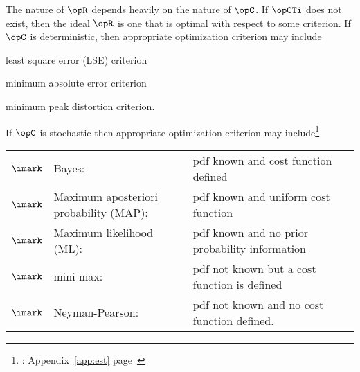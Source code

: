 The nature of $\opR$ depends heavily on the nature of $\opC$.
If $\opCTi$ does not exist,
then the ideal $\opR$ is one that is optimal with respect to some criterion.
If $\opC$ is deterministic,
then appropriate optimization criterion may include
\begin{liste}
   \item least square error (LSE) criterion
   \item minimum absolute error criterion
   \item minimum peak distortion criterion.
\end{liste}
If $\opC$ is stochastic
then appropriate optimization criterion may include\footnote{
  : Appendix~\ref{app:est} page~\pageref{app:est}
  }

\begin{tabular}{llll}
   $\imark$ & Bayes:                                  & pdf known and cost function defined \\
   $\imark$ & Maximum aposteriori probability (MAP):  & pdf known and uniform cost function \\
   $\imark$ & Maximum likelihood (ML):                & pdf known and no prior probability information\\
   $\imark$ & mini-max:                               & pdf not known but a cost function is defined \\
   $\imark$ & Neyman-Pearson:                         & pdf not known and no cost function defined.
\end{tabular}

